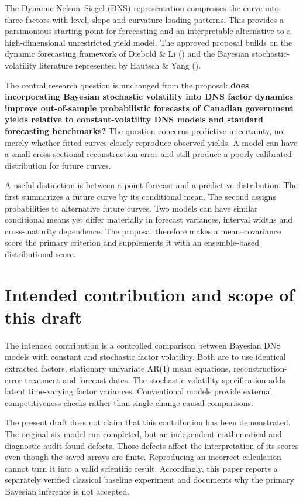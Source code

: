 \documentclass[
  12pt,
  letterpaper,
  DIV=11,
  numbers=noendperiod]{scrreprt}
\begin{document}
The Dynamic Nelson--Siegel (DNS) representation compresses the curve
into three factors with level, slope and curvature loading patterns.
This provides a parsimonious starting point for forecasting and an
interpretable alternative to a high-dimensional unrestricted yield
model. The approved proposal builds on the dynamic forecasting framework
of Diebold \& Li () and the
Bayesian stochastic-volatility literature represented by Hautsch \& Yang
().

The central research question is unchanged from the proposal:
\textbf{does incorporating Bayesian stochastic volatility into DNS
factor dynamics improve out-of-sample probabilistic forecasts of
Canadian government yields relative to constant-volatility DNS models
and standard forecasting benchmarks?} The question concerns predictive
uncertainty, not merely whether fitted curves closely reproduce observed
yields. A model can have a small cross-sectional reconstruction error
and still produce a poorly calibrated distribution for future curves.

A useful distinction is between a point forecast and a predictive
distribution. The first summarizes a future curve by its conditional
mean. The second assigns probabilities to alternative future curves. Two
models can have similar conditional means yet differ materially in
forecast variances, interval widths and cross-maturity dependence. The
proposal therefore makes a mean--covariance score the primary criterion
and supplements it with an ensemble-based distributional score.

\section{Intended contribution and scope of this
draft}\label{intended-contribution-and-scope-of-this-draft}

The intended contribution is a controlled comparison between Bayesian
DNS models with constant and stochastic factor volatility. Both are to
use identical extracted factors, stationary univariate AR(1) mean
equations, reconstruction-error treatment and forecast dates. The
stochastic-volatility specification adds latent time-varying factor
variances. Conventional models provide external competitiveness checks
rather than single-change causal comparisons.

The present draft does not claim that this contribution has been
demonstrated. The original six-model run completed, but an independent
mathematical and diagnostic audit found defects. Those defects affect
the interpretation of its scores even though the saved arrays are
finite. Reproducing an incorrect calculation cannot turn it into a valid
scientific result. Accordingly, this paper reports a separately verified
classical baseline experiment and documents why the primary Bayesian
inference is not accepted.
\end{document}
